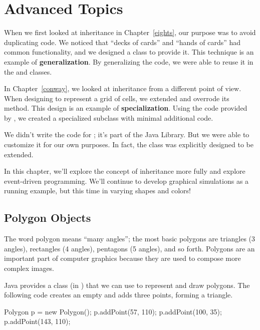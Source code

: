 \chapter{Advanced Topics}


When we first looked at inheritance in Chapter~\ref{eights}, our purpose was to avoid duplicating code.
We noticed that ``decks of cards'' and ``hands of cards'' had common functionality, and we designed a  class to provide it.
This technique is an example of {\bf generalization}.
By generalizing the code, we were able to reuse it in the  and  classes.


In Chapter~\ref{conway}, we looked at inheritance from a different point of view.
When designing  to represent a grid of cells, we extended  and overrode its  method.
This design is an example of {\bf specialization}.
Using the code provided by , we created a specialized subclass with minimal additional code.

We didn't write the code for ; it's part of the Java Library.
But we were able to customize it for our own purposes.
In fact, the  class was explicitly designed to be extended.

In this chapter, we'll explore the concept of inheritance more fully and explore event-driven programming.
We'll continue to develop graphical simulations as a running example, but this time in varying shapes and colors!


\section{Polygon Objects}

The word polygon means ``many angles''; the most basic polygons are triangles (3 angles), rectangles (4 angles), pentagons (5 angles), and so forth.
Polygons are an important part of computer graphics because they are used to compose more complex images.

Java provides a  class (in ) that we can use to represent and draw polygons.
The following code creates an empty  and adds three points, forming a triangle.

\begin{code}
Polygon p = new Polygon();
p.addPoint(57, 110);
p.addPoint(100, 35);
p.addPoint(143, 110);
\end{code}

